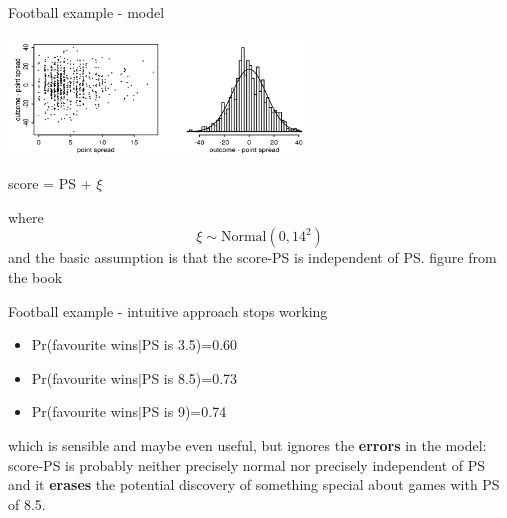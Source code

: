 \documentclass{beamer}
\newcommand{\cor}{\color{reddish}{}}
\newcommand{\cob}{\color{black}{}}
\begin{document}
\begin{frame}{Football example - model}

\begin{center}
    \includegraphics[width=8cm]{football_noise.png}
\end{center}
\cor
\begin{center} score = PS + $\xi$\end{center}
  \cob{}where\cor
  $$\xi\sim \mbox{Normal}(0,14^2)$$
  \cob
  and the basic assumption is that the \cor{}score-PS\cob{} is independent of  \cor{}PS\cob.
  \vfill
\color{gray}figure from the book\cob
\end{frame}

\begin{frame}{Football example - intuitive approach stops working}
 
  \begin{itemize}
  \item \cor{}Pr(favourite wins$|$PS is 3.5)=0.60\cob
  \item \cor{}Pr(favourite wins$|$PS is 8.5)=0.73\cob
  \item \cor{}Pr(favourite wins$|$PS is 9)=0.74\cob
  \end{itemize}
  \vskip 0.75cm
  which is sensible and maybe even useful, but ignores the
\textbf{errors} in the model: \cor{}score-PS\cob{} is probably neither
precisely normal nor precisely independent of \cor{}PS\cob{} and it
\textbf{erases} the potential discovery of something special about
games with PS of 8.5.
\end{frame}
\end{document}
